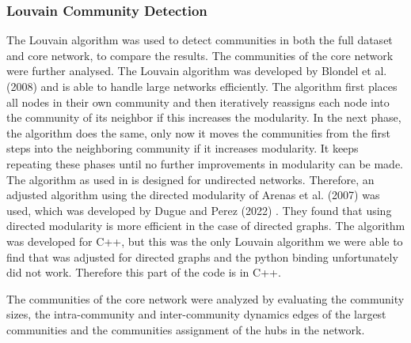 \documentclass[conference]{IEEEtran}
\begin{document}
\subsubsection{Louvain Community Detection}
The Louvain algorithm was used to detect communities in both the full dataset and core network, to compare the results. The communities of the core network were further analysed. The Louvain algorithm was developed by Blondel et al.(2008) \cite{blondel2008fast} and is able to handle large networks efficiently. The algorithm first places all nodes in their own community and then iteratively reassigns each node into the community of its neighbor if this increases the modularity. In the next phase, the algorithm does the same, only now it moves the communities from the first steps into the neighboring community if it increases modularity. It keeps repeating these phases until no further improvements in modularity can be made. The algorithm as used in \cite{blondel2008fast} is designed for undirected networks. Therefore, an adjusted algorithm using the directed modularity of Arenas et al. (2007) \cite{arenas2007size} was used, which was developed by Dugue and Perez (2022) \cite{dugue2022direction}. They found that using directed modularity is more efficient in the case of directed graphs. The algorithm was developed for C++, but this was the only Louvain algorithm we were able to find that was adjusted for directed graphs and the python binding unfortunately did not work. Therefore this part of the code is in C++. 

The communities of the core network were analyzed by evaluating the community sizes, the intra-community and inter-community dynamics edges of the largest communities and the communities assignment of the hubs in the network. 
\end{document}
